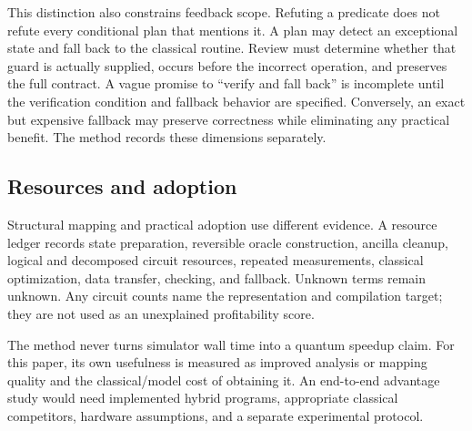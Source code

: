 This distinction also constrains feedback scope. Refuting a predicate does not
refute every conditional plan that mentions it. A plan may detect an exceptional
state and fall back to the classical routine. Review must determine whether that
guard is actually supplied, occurs before the incorrect operation, and preserves
the full contract. A vague promise to ``verify and fall back'' is incomplete until
the verification condition and fallback behavior are specified. Conversely, an
exact but expensive fallback may preserve correctness while eliminating any
practical benefit. The method records these dimensions separately.

\subsection{Resources and adoption}
Structural mapping and practical adoption use different evidence. A resource
ledger records state preparation, reversible oracle construction, ancilla cleanup,
logical and decomposed circuit resources, repeated measurements, classical
optimization, data transfer, checking, and fallback. Unknown terms remain unknown.
Any circuit counts name the representation and compilation target; they are not
used as an unexplained profitability score.

The method never turns simulator wall time into a quantum speedup claim. For this
paper, its own usefulness is measured as improved analysis or mapping quality and
the classical/model cost of obtaining it. An end-to-end advantage study would
need implemented hybrid programs, appropriate classical competitors, hardware
assumptions, and a separate experimental protocol.
